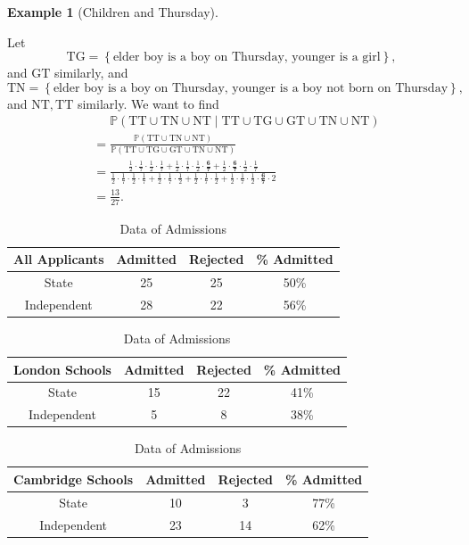 \documentclass[11pt]{article}
\numberwithin{equation}{section}
\theoremstyle{definition}
\newtheorem{example}[theorem]{Example}
\theoremstyle{remark}
\newcommand{\pqty}[1]{\left(#1\right)}
\newcommand{\Bqty}[1]{\left\{#1\right\}}
\newcommand{\Prob}{\mathbb P}
\newcommand{\Conditional}[2]{#1\mid #2}
\begin{document}
\begin{example}[Children and Thursday]
\begin{enumerate}
        Let
        \[
            \mathrm{TG} = \Bqty{\text{elder boy is a boy on Thursday, younger is a girl}},
        \]
        and \(\mathrm{GT}\) similarly, and
        \[
            \mathrm{TN} = \Bqty{\text{elder boy is a boy on Thursday, younger is a boy not born on Thursday}},
        \]
        and \(\mathrm{NT, TT}\) similarly. We want to find
        \begin{align*}
            &\phantom{=} \Prob\pqty{\Conditional{\mathrm{TT} \cup \mathrm{TN} \cup \mathrm{NT}}{\mathrm{TT} \cup \mathrm{TG} \cup \mathrm{GT} \cup \mathrm{TN} \cup \mathrm{NT}}} \\
            &= \frac{\Prob\pqty{\mathrm{TT} \cup \mathrm{TN} \cup \mathrm{NT}}}{\Prob\pqty{\mathrm{TT} \cup \mathrm{TG} \cup \mathrm{GT} \cup \mathrm{TN} \cup \mathrm{NT}}} \\
            &= \frac{\frac{1}{2} \cdot \frac{1}{7} \cdot \frac{1}{2} \cdot \frac{1}{7} + \frac{1}{2} \cdot \frac{1}{7} \cdot \frac{1}{2} \cdot \mathbf{\frac{6}{7}} + \frac{1}{2} \cdot \mathbf{\frac{6}{7}} \cdot \frac{1}{2} \cdot \frac{1}{7}}{\frac{1}{2} \cdot \frac{1}{7} \cdot \frac{1}{2} \cdot \frac{1}{7} + \frac{1}{2} \cdot \frac{1}{7} \cdot \frac{1}{2} + \frac{1}{2} \cdot \frac{1}{7} \cdot \frac{1}{2} + \frac{1}{2} \cdot \frac{1}{7} \cdot \frac{1}{2} \cdot \mathbf{\frac{6}{7}} \cdot 2}
 \\
            &= \frac{13}{27}.
        \end{align*}
    \end{enumerate}
\end{example}

\begin{table}[ht!]
    \centering
    \begin{tabular}{cccc}
        All Applicants & Admitted & Rejected & \% Admitted \\
        \hline
        State & 25 & 25 & 50\% \\
        Independent & 28 & 22 & 56\%
    \end{tabular}
    
    \vspace{1em}

    \begin{tabular}{cccc}
        London Schools & Admitted & Rejected & \% Admitted \\
        \hline
        State & 15 & 22 & 41\% \\
        Independent & 5 & 8 & 38\%
    \end{tabular}
    
    \vspace{1em}

    \begin{tabular}{cccc}
        Cambridge Schools & Admitted & Rejected & \% Admitted \\
        \hline
        State & 10 & 3 & 77\% \\
        Independent & 23 & 14 & 62\%
    \end{tabular}

    \caption{Data of Admissions}
    \label{probability-tab:simpson-paradox-data}
\end{table}
\end{document}
